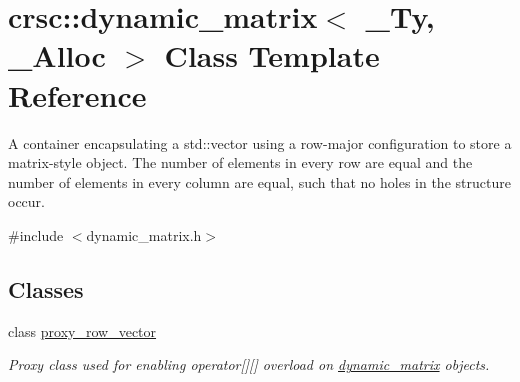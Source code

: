 \hypertarget{classcrsc_1_1dynamic__matrix}{}\section{crsc\+:\+:dynamic\+\_\+matrix$<$ \+\_\+\+Ty, \+\_\+\+Alloc $>$ Class Template Reference}
\label{classcrsc_1_1dynamic__matrix}


A container encapsulating a {\ttfamily std\+::vector} using a row-\/major configuration to store a matrix-\/style object. The number of elements in every row are equal and the number of elements in every column are equal, such that no holes in the structure occur.  




{\ttfamily \#include $<$dynamic\+\_\+matrix.\+h$>$}

\subsection*{Classes}
\begin{DoxyCompactItemize}
\item 
class \hyperlink{classcrsc_1_1dynamic__matrix_1_1proxy__row__vector}{proxy\+\_\+row\+\_\+vector}
\begin{DoxyCompactList}\small\item\em Proxy class used for enabling operator\mbox{[}\mbox{]}\mbox{[}\mbox{]} overload on \hyperlink{classcrsc_1_1dynamic__matrix}{dynamic\+\_\+matrix} objects. \end{DoxyCompactList}\end{DoxyCompactItemize}
